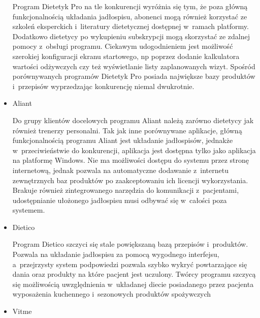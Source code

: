 \begin{itemize}
        Program Dietetyk Pro\cite{url:dietetyk-pro} na tle konkurencji wyróżnia się tym, że poza główną funkcjonalnością układania jadłospisu,
        abonenci mogą również korzystać ze szkoleń eksperckich i~literatury dietetycznej dostępnej w~ramach platformy.
        Dodatkowo dietetycy po wykupieniu subskrypcji mogą skorzystać ze zdalnej pomocy z~obsługi programu.
        Ciekawym udogodnieniem jest możliwość szerokiej konfiguracji ekranu startowego, np poprzez dodanie kalkulatora wartości odżywczych czy też wyświetlanie listy zaplanowanych wizyt.
        Spośród porównywanych programów Dietetyk Pro posiada największe bazy produktów i~przepisów wyprzedzając konkurencję niemal dwukrotnie.
%
    \item Aliant

        Do grupy klientów docelowych programu Aliant\cite{url:aliant} należą zarówno dietetycy jak również trenerzy personalni.
        Tak jak inne porównywane aplikacje, główną funkcjonalnością programu Aliant jest układanie jadłospisów,
        jednakże w~przeciwieństwie do konkurencji, aplikacja jest dostępna tylko jako aplikacja na platformę Windows.
        Nie ma możliwości dostępu do systemu przez stronę internetową, jednak pozwala na automatyczne dodawanie z~internetu zewnętrznych baz produktów po zaakceptowaniu ich licencji wykorzystania.
        Brakuje również zintegrowanego narzędzia do komunikacji z~pacjentami, udostępnianie ułożonego jadłospisu musi odbywać się w~całości poza systemem.
%
    \item Dietico

        Program Dietico\cite{url:dietico} szczyci się stale powiększaną bazą przepisów i~produktów.
        Pozwala na układanie jadłospisu za pomocą wygodnego interfejsu,
        a~przejrzysty system podpowiedzi pozwala szybko wykryć powtarzające się dania oraz produkty na które pacjent jest uczulony.
        Twórcy programu szczycą się możliwością uwzględnienia w~układanej diecie posiadanego przez pacjenta wyposażenia kuchennego i~sezonowych produktów spożywczych
%
    \item Vitme


\end{itemize}
